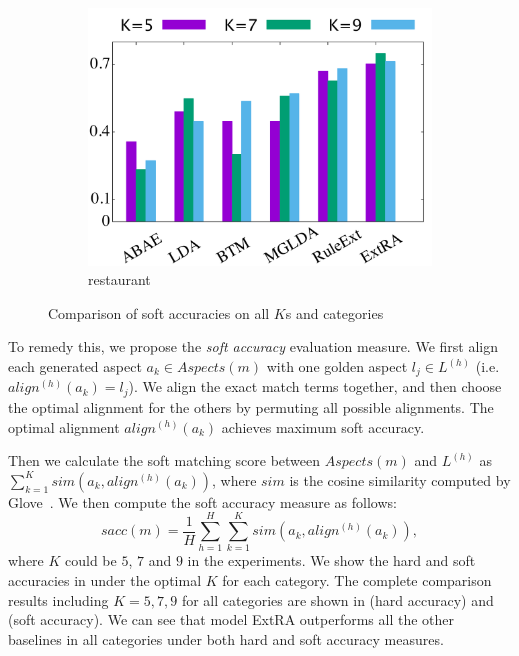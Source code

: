 \begin{figure}[!ht]
\begin{subfigure}{.333\textwidth}
		\includegraphics[width=0.99\linewidth]{figures/restaurant_s}
		\caption{restaurant}
		\label{fig:restaurant_s}
	\end{subfigure}
	
	\caption{Comparison of soft accuracies on all $K$s and categories }
	\label{fig:comparison_all_s}
\end{figure}

To remedy this, we propose the \emph{soft accuracy}  evaluation measure.
We first align each generated aspect $a_k \in Aspects(m)$
with one golden aspect $l_j \in L^{(h)}$ (i.e. $align^{(h)}(a_k)=l_j$). 
We align the exact match terms together, and then choose the optimal alignment for the others by permuting all possible alignments. 
The optimal alignment $align^{(h)}(a_k)$ achieves
maximum soft accuracy.

Then we calculate the soft matching score between
$Aspects(m)$ and $L^{(h)}$ as 
$\sum_{k=1}^{K}sim(a_k, align^{(h)}(a_k))$,
where $sim$ is the cosine similarity computed by 
Glove~\cite{pennington2014glove}. 
We then compute the soft accuracy measure as follows:
\begin{equation}
sacc(m) =\frac{1}{H}\sum_{h=1}^{H}\sum_{k=1}^{K}sim(a_k, align^{(h)}(a_k)), 
\end{equation}
where $K$ could be $5$, $7$ and $9$
in the experiments.
We show the hard and soft accuracies
in  under the optimal $K$ for each category. 
The complete comparison results including $K=5,7,9$ for all categories are shown
in  (hard accuracy) and  (soft accuracy).
We can see that model ExtRA outperforms all the other baselines 
in all categories under both hard and soft accuracy measures.




